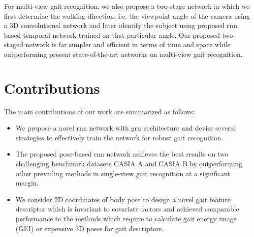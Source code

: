 For multi-view gait recognition, we also propose a two-stage network in which we first determine the walking direction, i.e. the viewpoint angle of the camera using a 3D convolutional network and later identify the subject using proposed \gls{rnn} based temporal network trained on that particular angle. Our proposed two-staged network is far simpler and efficient in terms of time and space while outperforming present state-of-the-art networks on multi-view gait recognition.


\section{Contributions}
The main contributions of our work are summarized as follows:
\begin{itemize}
\item We propose a novel \gls{rnn} network with \gls{gru} architecture and devise several strategies to effectively train the network for robust gait recognition. 

\item The proposed pose-based \gls{rnn} network achieves the best results on two challenging benchmark datasets CASIA A and CASIA B by outperforming other prevailing methods in single-view gait recognition at a significant margin.

\item We consider 2D coordinates of body pose to design a novel gait feature descriptor which is invariant to covariate factors and achieved comparable performance to the methods which require to calculate gait energy image (GEI) or expensive 3D poses for gait descriptors.
\end{itemize}


